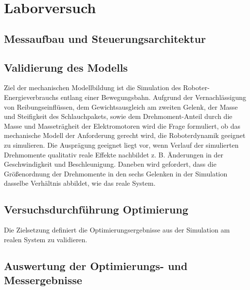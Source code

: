 \chapter{Laborversuch}
\section{Messaufbau und Steuerungsarchitektur}
\section{Validierung des Modells}

Ziel der  mechanischen Modellbildung ist die Simulation des Roboter-Energieverbrauchs entlang einer Bewegungsbahn. Aufgrund der Vernachlässigung von Reibungseinflüssen, dem Gewichtsausgleich am  zweiten Gelenk, der Masse und Steifigkeit des Schlauchpakets, sowie dem Drehmoment-Anteil durch die Masse und Masseträgheit der Elektromotoren  wird die Frage formuliert, ob das mechanische Modell der Anforderung gerecht wird, die Roboterdynamik geeignet zu simulieren. Die Ausprägung geeignet liegt vor, wenn Verlauf der simulierten Drehmomente qualitativ reale Effekte nachbildet z. B.  Änderungen in der Geschwindigkeit und Beschleunigung. Daneben wird gefordert, dass die Größenordnung der Drehmomente in den sechs  Gelenken in der Simulation dasselbe Verhältnis abbildet, wie das reale System.  

\section{Versuchsdurchführung Optimierung}
Die Zielsetzung definiert die Optimierungsergebnisse aus der Simulation am realen System zu validieren. 
\section{Auswertung der Optimierungs- und Messergebnisse}